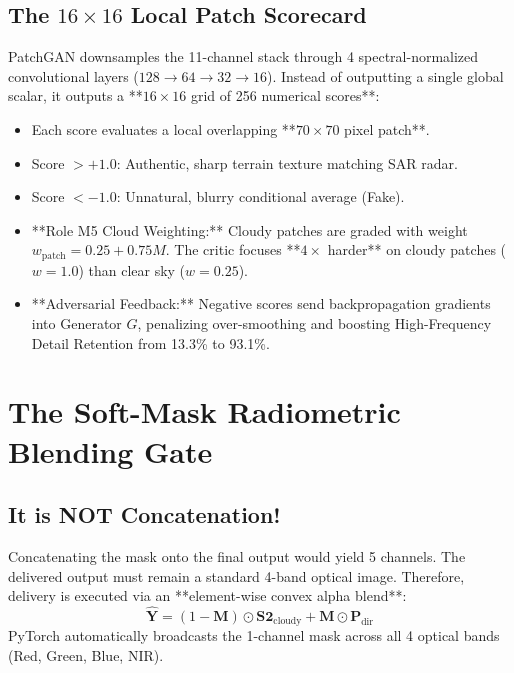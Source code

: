 \documentclass[11pt,a4paper]{article}
\begin{document}
\subsection{The $16 \times 16$ Local Patch Scorecard}
PatchGAN downsamples the 11-channel stack through 4 spectral-normalized convolutional layers ($128 \to 64 \to 32 \to 16$). Instead of outputting a single global scalar, it outputs a **$16 \times 16$ grid of 256 numerical scores**:
\begin{itemize}[leftmargin=1.5em]
    \item Each score evaluates a local overlapping **$70 \times 70$ pixel patch**.
    \item Score $> +1.0$: Authentic, sharp terrain texture matching SAR radar.
    \item Score $< -1.0$: Unnatural, blurry conditional average (Fake).
    \item **Role M5 Cloud Weighting:** Cloudy patches are graded with weight $w_{\text{patch}} = 0.25 + 0.75M$. The critic focuses **$4\times$ harder** on cloudy patches ($w=1.0$) than clear sky ($w=0.25$).
    \item **Adversarial Feedback:** Negative scores send backpropagation gradients into Generator $G$, penalizing over-smoothing and boosting High-Frequency Detail Retention from 13.3\% to 93.1\%.
\end{itemize}

\section{The Soft-Mask Radiometric Blending Gate}

\subsection{It is NOT Concatenation!}
Concatenating the mask onto the final output would yield 5 channels. The delivered output must remain a standard 4-band optical image. Therefore, delivery is executed via an **element-wise convex alpha blend**:
\begin{equation}
\mathbf{\hat{Y}} = (1 - \mathbf{M}) \odot \mathbf{S2}_{\text{cloudy}} + \mathbf{M} \odot \mathbf{P}_{\text{dir}}
\end{equation}
PyTorch automatically broadcasts the 1-channel mask across all 4 optical bands (Red, Green, Blue, NIR).
\end{document}
